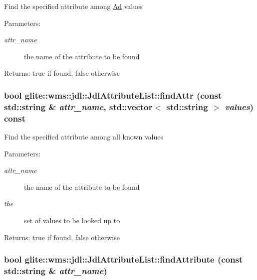 Find the specified attribute among \hyperlink{classglite_1_1wms_1_1jdl_1_1Ad}{Ad} values \begin{Desc}
\item[Parameters:]
\begin{description}
\item[{\em attr\_\-name}]the name of the attribute to be found \end{description}
\end{Desc}
\begin{Desc}
\item[Returns:]true if found, false otherwise \end{Desc}
\hypertarget{classglite_1_1wms_1_1jdl_1_1JdlAttributeList_a11}{
\subsubsection[findAttr]{\setlength{\rightskip}{0pt plus 5cm}bool glite::wms::jdl::Jdl\-Attribute\-List::find\-Attr (const std::string \& {\em attr\_\-name}, std::vector$<$ std::string $>$ {\em values}) const}}
\label{classglite_1_1wms_1_1jdl_1_1JdlAttributeList_a11}


Find the specified attribute among all known values \begin{Desc}
\item[Parameters:]
\begin{description}
\item[{\em attr\_\-name}]the name of the attribute to be found \item[{\em the}]set of values to be looked up to \end{description}
\end{Desc}
\begin{Desc}
\item[Returns:]true if found, false otherwise \end{Desc}
\hypertarget{classglite_1_1wms_1_1jdl_1_1JdlAttributeList_a10}{
\subsubsection[findAttribute]{\setlength{\rightskip}{0pt plus 5cm}bool glite::wms::jdl::Jdl\-Attribute\-List::find\-Attribute (const std::string \& {\em attr\_\-name})}}
\label{classglite_1_1wms_1_1jdl_1_1JdlAttributeList_a10}


